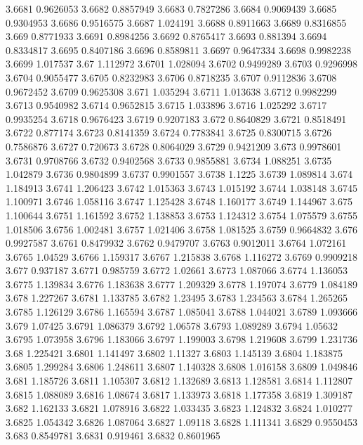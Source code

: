 3.6681  0.9626053
3.6682  0.8857949
3.6683  0.7827286
3.6684  0.9069439
3.6685  0.9304953
3.6686  0.9516575
3.6687  1.024191
3.6688  0.8911663
3.6689  0.8316855
3.669  0.8771933
3.6691  0.8984256
3.6692  0.8765417
3.6693  0.881394
3.6694  0.8334817
3.6695  0.8407186
3.6696  0.8589811
3.6697  0.9647334
3.6698  0.9982238
3.6699  1.017537
3.67  1.112972
3.6701  1.028094
3.6702  0.9499289
3.6703  0.9296998
3.6704  0.9055477
3.6705  0.8232983
3.6706  0.8718235
3.6707  0.9112836
3.6708  0.9672452
3.6709  0.9625308
3.671  1.035294
3.6711  1.013638
3.6712  0.9982299
3.6713  0.9540982
3.6714  0.9652815
3.6715  1.033896
3.6716  1.025292
3.6717  0.9935254
3.6718  0.9676423
3.6719  0.9207183
3.672  0.8640829
3.6721  0.8518491
3.6722  0.877174
3.6723  0.8141359
3.6724  0.7783841
3.6725  0.8300715
3.6726  0.7586876
3.6727  0.720673
3.6728  0.8064029
3.6729  0.9421209
3.673  0.9978601
3.6731  0.9708766
3.6732  0.9402568
3.6733  0.9855881
3.6734  1.088251
3.6735  1.042879
3.6736  0.9804899
3.6737  0.9901557
3.6738  1.1225
3.6739  1.089814
3.674  1.184913
3.6741  1.206423
3.6742  1.015363
3.6743  1.015192
3.6744  1.038148
3.6745  1.100971
3.6746  1.058116
3.6747  1.125428
3.6748  1.160177
3.6749  1.144967
3.675  1.100644
3.6751  1.161592
3.6752  1.138853
3.6753  1.124312
3.6754  1.075579
3.6755  1.018506
3.6756  1.002481
3.6757  1.021406
3.6758  1.081525
3.6759  0.9664832
3.676  0.9927587
3.6761  0.8479932
3.6762  0.9479707
3.6763  0.9012011
3.6764  1.072161
3.6765  1.04529
3.6766  1.159317
3.6767  1.215838
3.6768  1.116272
3.6769  0.9909218
3.677  0.937187
3.6771  0.985759
3.6772  1.02661
3.6773  1.087066
3.6774  1.136053
3.6775  1.139834
3.6776  1.183638
3.6777  1.209329
3.6778  1.197074
3.6779  1.084189
3.678  1.227267
3.6781  1.133785
3.6782  1.23495
3.6783  1.234563
3.6784  1.265265
3.6785  1.126129
3.6786  1.165594
3.6787  1.085041
3.6788  1.044021
3.6789  1.093666
3.679  1.07425
3.6791  1.086379
3.6792  1.06578
3.6793  1.089289
3.6794  1.05632
3.6795  1.073958
3.6796  1.183066
3.6797  1.199003
3.6798  1.219608
3.6799  1.231736
3.68  1.225421
3.6801  1.141497
3.6802  1.11327
3.6803  1.145139
3.6804  1.183875
3.6805  1.299284
3.6806  1.248611
3.6807  1.140328
3.6808  1.016158
3.6809  1.049846
3.681  1.185726
3.6811  1.105307
3.6812  1.132689
3.6813  1.128581
3.6814  1.112807
3.6815  1.088089
3.6816  1.08674
3.6817  1.133973
3.6818  1.177358
3.6819  1.309187
3.682  1.162133
3.6821  1.078916
3.6822  1.033435
3.6823  1.124832
3.6824  1.010277
3.6825  1.054342
3.6826  1.087064
3.6827  1.09118
3.6828  1.111341
3.6829  0.9550453
3.683  0.8549781
3.6831  0.919461
3.6832  0.8601965

